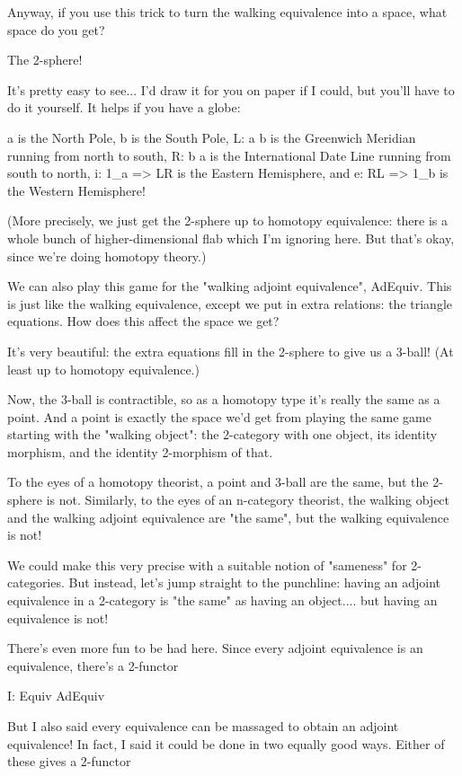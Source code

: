 Anyway, if you use this trick to turn the walking equivalence into
a space, what space do you get?  

The 2-sphere!  

It's pretty easy to see... I'd draw it for you on paper if I could, but
you'll have to do it yourself.  It helps if you have a globe:

a is the North Pole, 
b is the South Pole, 
L: a \to  b is the Greenwich Meridian running from north to south, 
R: b \to  a is the International Date Line running from south to north, 
i: 1_{a} => LR is the Eastern Hemisphere, and 
e: RL => 1_{b} is the Western Hemisphere!

(More precisely, we just get the 2-sphere up to homotopy equivalence:
there is a whole bunch of higher-dimensional flab which I'm ignoring
here.  But that's okay, since we're doing homotopy theory.)

We can also play this game for the "walking adjoint equivalence",
AdEquiv.  This is just like the walking equivalence, except we put in
extra relations: the triangle equations.  How does this affect the space
we get?

It's very beautiful: the extra equations fill in the 2-sphere to give us
a 3-ball!  (At least up to homotopy equivalence.)


Now, the 3-ball is contractible, so as a homotopy type it's really the
same as a point.  And a point is exactly the space we'd get from playing
the same game starting with the "walking object": the
2-category with one object, its identity morphism, and the identity
2-morphism of that.


To the eyes of a homotopy theorist, a point and 3-ball are the same, but
the 2-sphere is not.  Similarly, to the eyes of an n-category theorist,
the walking object and the walking adjoint equivalence are "the
same", but the walking equivalence is not!


We could make this very precise with a suitable notion of
"sameness" for 2-categories.  But instead, let's jump straight
to the punchline: having an adjoint equivalence in a 2-category is
"the same" as having an object.... but having an equivalence
is not!

There's even more fun to be had here.  Since every adjoint equivalence
is an equivalence, there's a 2-functor

I: Equiv \to  AdEquiv

But I also said every equivalence can be massaged to obtain an adjoint
equivalence!  In fact, I said it could be done in two equally good ways.
Either of these gives a 2-functor

